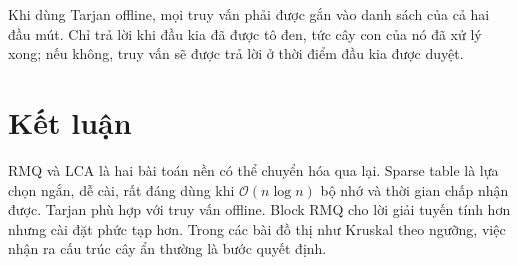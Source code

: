 \documentclass[11pt]{article}
\newcommand{\Oh}{\mathcal{O}}
\begin{document}
Khi dùng Tarjan offline, mọi truy vấn phải được gắn vào danh sách của cả hai
đầu mút. Chỉ trả lời khi đầu kia đã được tô đen, tức cây con của nó đã xử lý
xong; nếu không, truy vấn sẽ được trả lời ở thời điểm đầu kia được duyệt.

\section{Kết luận}

RMQ và LCA là hai bài toán nền có thể chuyển hóa qua lại. Sparse table là lựa
chọn ngắn, dễ cài, rất đáng dùng khi \(\Oh(n\log n)\) bộ nhớ và thời gian chấp
nhận được. Tarjan phù hợp với truy vấn offline. Block RMQ cho lời giải tuyến
tính hơn nhưng cài đặt phức tạp hơn. Trong các bài đồ thị như Kruskal theo
ngưỡng, việc nhận ra cấu trúc cây ẩn thường là bước quyết định.
\end{document}
